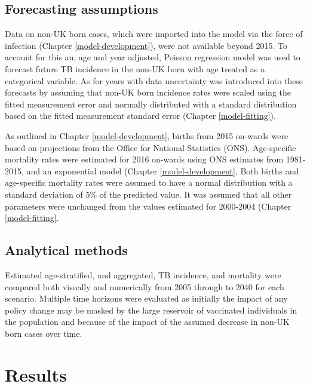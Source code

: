 \documentclass[11pt,twoside]{bristolthesis}
\begin{document}
  \hypertarget{forecasting-assumptions}{%
  \subsection{Forecasting assumptions}\label{forecasting-assumptions}}
  
  Data on non-UK born cases, which were imported into the model via the force of infection (Chapter \ref{model-development}), were not available beyond 2015. To account for this an, age and year adjusted, Poisson regression model was used to forecast future TB incidence in the non-UK born with age treated as a categorical variable. As for years with data uncertainty was introduced into these forecasts by assuming that non-UK born incidence rates were scaled using the fitted measurement error and normally distributed with a standard distribution based on the fitted measurement standard error (Chapter \ref{model-fitting}).
  
  As outlined in Chapter \ref{model-development}, births from 2015 on-wards were based on projections from the Office for National Statistics (ONS). Age-specific mortality rates were estimated for 2016 on-wards using ONS estimates from 1981-2015, and an exponential model (Chapter \ref{model-development}. Both births and age-specific mortality rates were assumed to have a normal distribution with a standard deviation of 5\% of the predicted value. It was assumed that all other parameters were unchanged from the values estimated for 2000-2004 (Chapter \ref{model-fitting}.
  
  \hypertarget{analytical-methods}{%
  \subsection{Analytical methods}\label{analytical-methods}}
  
  Estimated age-stratified, and aggregated, TB incidence, and mortality were compared both visually and numerically from 2005 through to 2040 for each scenario. Multiple time horizons were evaluated as initially the impact of any policy change may be masked by the large reservoir of vaccinated individuals in the population and because of the impact of the assumed decrease in non-UK born cases over time.
  
  \hypertarget{results-4}{%
  \section{Results}\label{results-4}}
  
\end{document}
